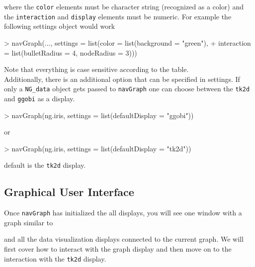 \documentclass[12pt,oneside,titlepage,letter]{article}
\newcommand{\modify}[1]{{\color{blue}#1}}
\begin{document}
where the \texttt{color} elements must be character string (recognized as a color) and the \texttt{interaction} and \texttt{display} elements must be numeric. For example the following settings object would work

\begin{Schunk}
\begin{Sinput}
> navGraph(..., settings = list(color = list(background = "green"), 
+     interaction = list(bulletRadius = 4, nodeRadius = 3)))
\end{Sinput}
\end{Schunk}
Note that \modify{everything} is case sensitive according to the table.\\

Additionally, there is an additional option that can be specified in settings. If only a \texttt{NG\_data} object gets passed to \texttt{navGraph} one can choose between the \texttt{tk2d} and \texttt{ggobi} as a display.

\begin{Schunk}
\begin{Sinput}
> navGraph(ng.iris, settings = list(defaultDisplay = "ggobi"))
\end{Sinput}
\end{Schunk}
or 
\begin{Schunk}
\begin{Sinput}
> navGraph(ng.iris, settings = list(defaultDisplay = "tk2d"))
\end{Sinput}
\end{Schunk}
default is the \texttt{tk2d} display.


\subsection{Graphical User Interface}
Once \texttt{navGraph} has initialized the all displays, you will see one window with a graph similar to

\begin{center}
\end{center}
and all the data visualization displays connected to the current graph. We will first cover how to interact with the graph display and then move on to the interaction with the \texttt{tk2d} display.\\
\end{document}

